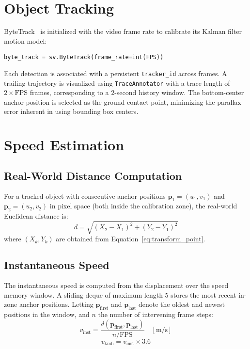 \documentclass[12pt]{report}
\begin{document}
\section{Object Tracking}

ByteTrack~\cite{Zhang2022} is initialized with the video frame rate to calibrate its Kalman filter motion model:
\begin{lstlisting}[caption={ByteTrack Initialization},label={lst:bytetrack}]
byte_track = sv.ByteTrack(frame_rate=int(FPS))
\end{lstlisting}
Each detection is associated with a persistent \texttt{tracker\_id} across frames.
A trailing trajectory is visualized using \texttt{TraceAnnotator} with a trace length of $2 \times \text{FPS}$ frames, corresponding to a 2-second history window.
The bottom-center anchor position is selected as the ground-contact point, minimizing the parallax error inherent in using bounding box centers.

\section{Speed Estimation}

\subsection{Real-World Distance Computation}

For a tracked object with consecutive anchor positions $\mathbf{p}_1 = (u_1, v_1)$ and $\mathbf{p}_2 = (u_2, v_2)$ in pixel space (both inside the calibration zone), the real-world Euclidean distance is:
\begin{equation}
    d = \sqrt{(X_2 - X_1)^2 + (Y_2 - Y_1)^2}
    \label{eq:real_distance}
\end{equation}
where $(X_k, Y_k)$ are obtained from Equation~\eqref{eq:transform_point}.

\subsection{Instantaneous Speed}

The instantaneous speed is computed from the displacement over the speed memory window.
A sliding deque of maximum length 5 stores the most recent in-zone anchor positions.
Letting $\mathbf{p}_\text{first}$ and $\mathbf{p}_\text{last}$ denote the oldest and newest positions in the window, and $n$ the number of intervening frame steps:
\begin{equation}
    v_\text{inst} = \frac{d(\mathbf{p}_\text{first}, \mathbf{p}_\text{last})}{n / \text{FPS}}
    \quad [\text{m/s}]
    \label{eq:speed_mps}
\end{equation}
\begin{equation}
    v_\text{kmh} = v_\text{inst} \times 3.6
    \label{eq:speed_kmh}
\end{equation}
\end{document}
